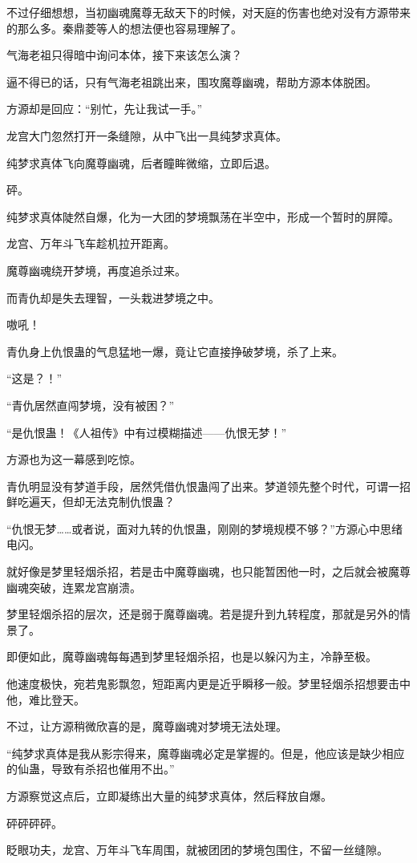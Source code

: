 \begin{this_body}
不过仔细想想，当初幽魂魔尊无敌天下的时候，对天庭的伤害也绝对没有方源带来的那么多。秦鼎菱等人的想法便也容易理解了。

气海老祖只得暗中询问本体，接下来该怎么演？

逼不得已的话，只有气海老祖跳出来，围攻魔尊幽魂，帮助方源本体脱困。

方源却是回应：“别忙，先让我试一手。”

龙宫大门忽然打开一条缝隙，从中飞出一具纯梦求真体。

纯梦求真体飞向魔尊幽魂，后者瞳眸微缩，立即后退。

砰。

纯梦求真体陡然自爆，化为一大团的梦境飘荡在半空中，形成一个暂时的屏障。

龙宫、万年斗飞车趁机拉开距离。

魔尊幽魂绕开梦境，再度追杀过来。

而青仇却是失去理智，一头栽进梦境之中。

嗷吼！

青仇身上仇恨蛊的气息猛地一爆，竟让它直接挣破梦境，杀了上来。

“这是？！”

“青仇居然直闯梦境，没有被困？”

“是仇恨蛊！《人祖传》中有过模糊描述——仇恨无梦！”

方源也为这一幕感到吃惊。

青仇明显没有梦道手段，居然凭借仇恨蛊闯了出来。梦道领先整个时代，可谓一招鲜吃遍天，但却无法克制仇恨蛊？

“仇恨无梦……或者说，面对九转的仇恨蛊，刚刚的梦境规模不够？”方源心中思绪电闪。

就好像是梦里轻烟杀招，若是击中魔尊幽魂，也只能暂困他一时，之后就会被魔尊幽魂突破，连累龙宫崩溃。

梦里轻烟杀招的层次，还是弱于魔尊幽魂。若是提升到九转程度，那就是另外的情景了。

即便如此，魔尊幽魂每每遇到梦里轻烟杀招，也是以躲闪为主，冷静至极。

他速度极快，宛若鬼影飘忽，短距离内更是近乎瞬移一般。梦里轻烟杀招想要击中他，难比登天。

不过，让方源稍微欣喜的是，魔尊幽魂对梦境无法处理。

“纯梦求真体是我从影宗得来，魔尊幽魂必定是掌握的。但是，他应该是缺少相应的仙蛊，导致有杀招也催用不出。”

方源察觉这点后，立即凝练出大量的纯梦求真体，然后释放自爆。

砰砰砰砰。

眨眼功夫，龙宫、万年斗飞车周围，就被团团的梦境包围住，不留一丝缝隙。


\end{this_body}
